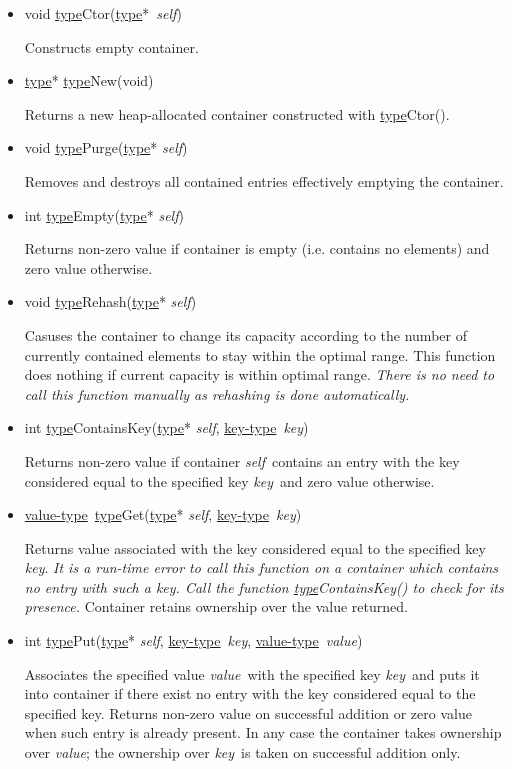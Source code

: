 \documentclass[a4paper]{article}
\newcommand{\st}{\underline{type}}
\newcommand{\kt}{\underline{key-type}}
\newcommand{\vt}{\underline{value-type}}
\newcommand{\sv}{\emph{self}}
\newcommand{\kv}{\emph{key}}
\newcommand{\vv}{\emph{value}}
\newcommand{\meth}[1]{#1}
\begin{document}
\begin{itemize}


\item \meth{void \st Ctor(\st*\ \sv)}


Constructs empty container.


\item \meth{\st* \st New(void)}


Returns a new heap-allocated container constructed with \meth{\st Ctor()}.


\commonmethods


\item \meth{void \st Purge}(\st* \sv)


Removes and destroys all contained entries effectively emptying the container.


\item \meth{int \st Empty}(\st* \sv)


Returns non-zero value if container is empty (i.e. contains no elements) and zero value otherwise.


\item \meth{void \st Rehash(\st* \sv)}


Casuses the container to change its capacity according to the number of currently contained elements to stay within the optimal range.
This function does nothing if current capacity is within optimal range.
\emph{There is no need to call this function manually as rehashing is done automatically.}


\item \meth{int \st ContainsKey(\st* \sv, \kt\ \kv)}


Returns non-zero value if container \sv\ contains an entry with the key considered equal to the specified key \kv\ and zero value otherwise.


\item \meth{\vt\ \st Get(\st* \sv, \kt\ \kv)}


Returns value associated with the key considered equal to the specified key \kv.
\emph{It is a run-time error to call this function on a container which contains no entry with such a key. Call the function \meth{\st ContainsKey()} to check for its presence.}
Container retains ownership over the value returned.


\item \meth{int \st Put(\st* \sv, \kt\ \kv, \vt\ \vv)}


Associates the specified value \vv\ with the specified key \kv\ and puts it into container if there exist no entry with the key considered equal to the specified key.
Returns non-zero value on successful addition or zero value when such entry is already present.
In any case the container takes ownership over \vv; the ownership over \kv\ is taken on successful addition only.



\end{itemize}
\end{document}
